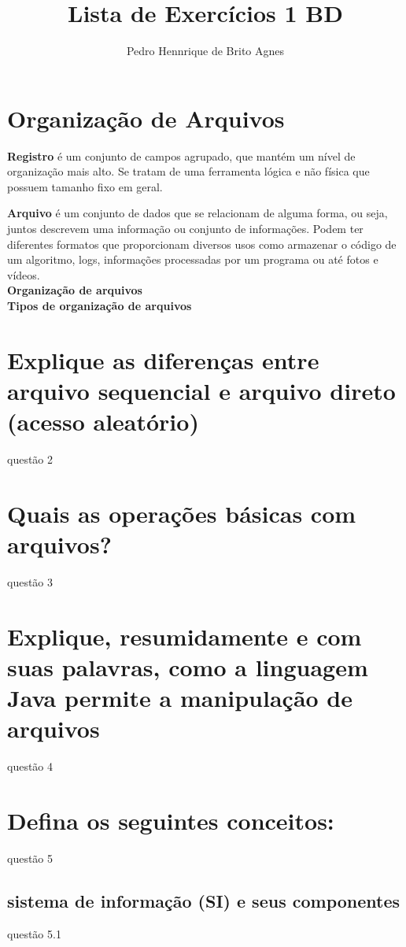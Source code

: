 \documentclass[12pt]{article}
\begin{document}
\title{Lista de Exercícios 1 BD}
\author{Pedro Hennrique de Brito Agnes}

\maketitle

\section{Organização de Arquivos}
\textbf{Registro} é um conjunto de campos agrupado, que mantém um nível de organização mais alto. Se tratam de uma ferramenta lógica e não física que possuem tamanho fixo em geral. 

\noindent
\textbf{Arquivo} é um conjunto de dados que se relacionam de alguma forma, ou seja, juntos descrevem uma informação ou conjunto de informações. Podem ter diferentes formatos que proporcionam diversos usos como armazenar o código de um algoritmo, logs, informações processadas por um programa ou até fotos e vídeos.\\

\noindent
\textbf{Organização de arquivos}\\

\noindent
\textbf{Tipos de organização de arquivos}

\section{Explique as diferenças entre arquivo sequencial e arquivo direto (acesso aleatório)}
questão 2

\section{Quais as operações básicas com arquivos?}
questão 3

\section{Explique, resumidamente e com suas palavras, como a linguagem Java permite a manipulação de arquivos}
questão 4

\section{Defina os seguintes conceitos:}
questão 5

\subsection{sistema de informação (SI) e seus componentes}
questão 5.1
\end{document}
